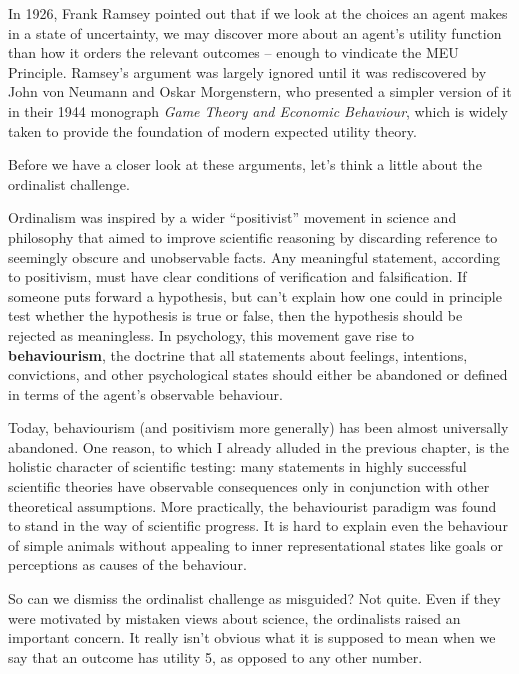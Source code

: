 In 1926, Frank Ramsey pointed out that if we look at the choices an
agent makes in a state of uncertainty, we may discover more about an
agent's utility function than how it orders the relevant outcomes --
enough to vindicate the MEU Principle. Ramsey's argument was largely
ignored until it was rediscovered by John von Neumann and Oskar
Morgenstern, who presented a simpler version of it in their 1944
monograph \emph{Game Theory and Economic Behaviour}, which is widely
taken to provide the foundation of modern expected utility theory.

Before we have a closer look at these arguments, let's think a
little about the ordinalist challenge.

Ordinalism was inspired by a wider ``positivist'' movement in science
and philosophy that aimed to improve scientific reasoning by
discarding reference to seemingly obscure and unobservable facts. Any
meaningful statement, according to positivism, must have clear
conditions of verification and falsification. If someone puts
forward a hypothesis, but can't explain how one could in principle
test whether the hypothesis is true or false, then the hypothesis
should be rejected as meaningless.  In psychology, this movement gave
rise to \textbf{behaviourism}, the doctrine that all statements about
feelings, intentions, convictions, and other psychological states
should either be abandoned or defined in terms of the agent's
observable behaviour.

Today, behaviourism (and positivism more generally) has been almost
universally abandoned.  One reason, to which I already alluded in the
previous chapter, is the holistic character of scientific testing:
many statements in highly successful scientific theories have
observable consequences only in conjunction with other theoretical
assumptions.%
%
More practically, the behaviourist paradigm was found to stand in the
way of scientific progress. It is hard to explain even the behaviour
of simple animals without appealing to inner representational states
like goals or perceptions as causes of the behaviour.

So can we dismiss the ordinalist challenge as misguided? Not
quite. Even if they were motivated by mistaken views about science,
the ordinalists raised an important concern. It really isn't obvious
what it is supposed to mean when we say that an outcome has utility 5,
as opposed to any other number.

